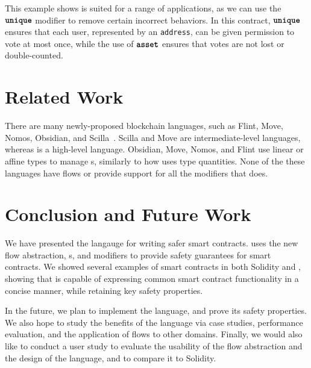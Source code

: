\documentclass[nonacm, dvipsnames, sigconf]{acmart}
\begin{document}
This example shows \langName is suited for a range of applications, as we can use the $\textbf{\texttt{unique}}$ modifier to remove certain incorrect behaviors.
In this contract, $\textbf{\texttt{unique}}$ ensures that each user, represented by an \lstinline{address}, can be given permission to vote at most once, while the use of $\textbf{\texttt{asset}}$ ensures that votes are not lost or double-counted.

\section{Related Work}
There are many newly-proposed blockchain languages, such as Flint, Move, Nomos, Obsidian, and Scilla~\cite{schrans2018flint, blackshear2019move, das2019nomos, coblenz2019obsidian, sergey2019scilla}.
Scilla and Move are intermediate-level languages, whereas \langName is a high-level language.
Obsidian, Move, Nomos, and Flint use linear or affine types to manage \assetTxt{}s, similarly to how \langName uses type quantities.
None of the these languages have flows or provide support for all the modifiers that \langName does.

\section{Conclusion and Future Work}

We have presented the \langName langauge for writing safer smart contracts.
\langName uses the new flow abstraction, \assetTxt{}s, and modifiers to provide safety guarantees for smart contracts.
We showed several examples of smart contracts in both Solidity and \langName, showing that \langName is capable of expressing common smart contract functionality in a concise manner, while retaining key safety properties.

In the future, we plan to implement the \langName language, and prove its safety properties.
We also hope to study the benefits of the language via case studies, performance evaluation, and the application of flows to other domains.
Finally, we would also like to conduct a user study to evaluate the usability of the flow abstraction and the design of the language, and to compare it to Solidity.



\end{document}
